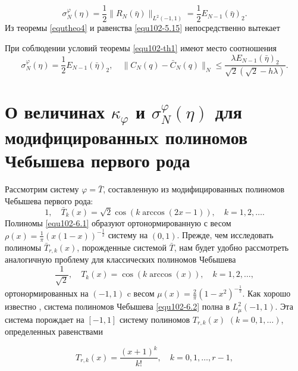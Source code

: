 \begin{equation}\label{equ102-5.15}
\sigma_N^\varphi(\eta)=\frac12\|R_N(\bar\eta)\|_{L^2(-1,1)}=\frac12E_{N-1}(\bar\eta)_2.
\end{equation}
Из теоремы \ref{equtheo4} и равенства \eqref{equ102-5.15} непосредственно вытекает
\begin{theorem}\label{equtheo6}
  При соблюдении условий теоремы \ref{equ102-th1} имеют место соотношения
  \begin{equation}\label{equ102-5.16}
  \sigma_N^\varphi(\eta)=\frac12E_{N-1}(\bar\eta)_2, \quad
\|C_N(q)-\bar C_N(q)\|_N\le \frac{\lambda E_{N-1}(\bar\eta)_2} {\sqrt{2}(\sqrt{2}-h\lambda)}.
\end{equation}
\end{theorem}






\section{О величинах  $\kappa_\varphi$ и $\sigma_N^\varphi(\eta)$ для модифицированныx полиномов Чебышева первого рода}


Рассмотрим систему $\varphi=\bar T$, составленную из модифицированных полиномов Чебышева первого рода:
 \begin{equation}\label{equ102-6.1}
1,\quad \bar T_k(x)=\sqrt{2}\cos(k\arccos(2x-1)), \quad k=1,2,\ldots.
\end{equation}
 Полиномы \eqref{equ102-6.1} образуют ортонормированную   с весом  $\rho(x)=\frac1\pi(x(1-x))^{-\frac12}$ систему на $(0,1)$. Прежде, чем  исследовать полиномы $\bar T_{r,k}(x)$, порожденные системой $\bar T$, нам будет удобно рассмотреть аналогичную проблему для классических  полиномов Чебышева
 \begin{equation}\label{equ102-6.2}
\frac{1}{\sqrt{2}},\quad  T_k(x)=\cos(k\arccos(x)), \quad k=1,2,\ldots,
\end{equation}
ортонормированных на $(-1,1)$ c весом  $\mu(x)=\frac2\pi(1-x^2)^{-\frac12}$.
   Как хорошо известно \cite{laplas-Sege}, система полиномов Чебышева \eqref{equ102-6.2} полна в $L_\mu^2(-1,1)$.   Эта система порождает на $[-1,1]$ систему полиномов $T_{r,k}(x)$ $(k=0,1,\ldots)$, определенных равенствами

  \begin{equation}\label{equ102-6.3}
T_{r,k}(x) =\frac{(x+1)^k}{k!}, \quad k=0,1,\ldots, r-1,
\end{equation}

